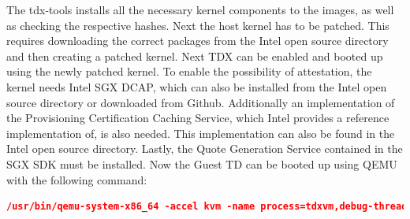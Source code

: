 \begin{table}
\centering
{}
\caption{Comparison of different timings of IPEX optimization method}
\label{tab:BOM}
\end{table}
The tdx-tools installs all the necessary kernel components to the images, as well as checking the respective hashes. Next the host kernel has to be patched. This requires downloading the correct packages from the Intel open source directory and then creating a patched kernel. Next TDX can be enabled and booted up using the newly patched kernel. To enable the possibility of attestation, the kernel needs Intel SGX DCAP, which can also be installed from the Intel open source directory or downloaded from Github. Additionally an implementation of the Provisioning Certification Caching Service, which Intel provides a reference implementation of, is also needed. This implementation can also be found in the Intel open source directory. Lastly, the Quote Generation Service contained in the SGX SDK must be installed. Now the Guest TD can be booted up using QEMU with the following command:
\begin{lstlisting}[language=json, frame=single, float=h,caption={test}]
     /usr/bin/qemu-system-x86_64 -accel kvm -name process=tdxvm,debug-threads=on -m 64G -vga none -monitor pty -no-hpet -nodefaults -drive file=/tmp/tdx-guest-ubuntu-22.04.qcow2,if=virtio,format=qcow2 -monitor telnet:127.0.0.1:9001,server,nowait -bios /usr/share/qemu/OVMF.fd -object tdx-guest,sept-ve-disable=on,id=tdx -object memory-backend-memfd-private,id=ram1,size=64G -cpu host,-kvm-steal-time,pmu=off -machine q35,kernel_irqchip=split,confidential-guest-support=tdx,memory-backend=ram1 -device virtio-net-pci,netdev=mynet0 -netdev user,id=mynet0,net=10.0.2.0/24,dhcpstart=10.0.2.15,hostfwd=tcp::10026-:22 -smp 32 -chardev stdio,id=mux,mux=on,logfile=/home/test/tdx-tools/vm_log_2024-03-08T0901.log -device virtio-serial,romfile= -device virtconsole,chardev=mux -monitor chardev:mux -serial chardev:mux -nographic
\end{lstlisting}

